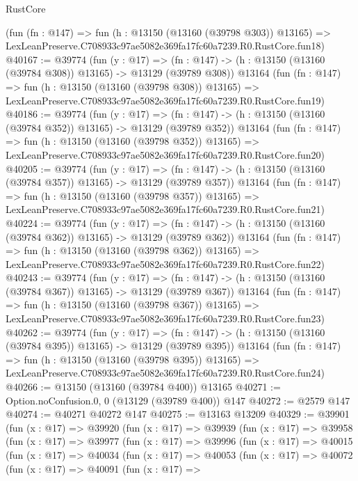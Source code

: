 \begin{lexlean}{RustCore}
\begin{coremodule}
    (fun (fn : @147) =>
    fun (h : @13150 (@13160 (@39798 @303)) @13165) =>
    LexLeanPreserve.C708933c97ae5082e369fa17fc60a7239.R0.RustCore.fun18)
@40167 := @39774
    (fun (y : @17) =>
    (fn : @147) -> (h : @13150 (@13160 (@39784 @308)) @13165) -> @13129 (@39789 @308))
    @13164
    (fun (fn : @147) =>
    fun (h : @13150 (@13160 (@39798 @308)) @13165) =>
    LexLeanPreserve.C708933c97ae5082e369fa17fc60a7239.R0.RustCore.fun19)
@40186 := @39774
    (fun (y : @17) =>
    (fn : @147) -> (h : @13150 (@13160 (@39784 @352)) @13165) -> @13129 (@39789 @352))
    @13164
    (fun (fn : @147) =>
    fun (h : @13150 (@13160 (@39798 @352)) @13165) =>
    LexLeanPreserve.C708933c97ae5082e369fa17fc60a7239.R0.RustCore.fun20)
@40205 := @39774
    (fun (y : @17) =>
    (fn : @147) -> (h : @13150 (@13160 (@39784 @357)) @13165) -> @13129 (@39789 @357))
    @13164
    (fun (fn : @147) =>
    fun (h : @13150 (@13160 (@39798 @357)) @13165) =>
    LexLeanPreserve.C708933c97ae5082e369fa17fc60a7239.R0.RustCore.fun21)
@40224 := @39774
    (fun (y : @17) =>
    (fn : @147) -> (h : @13150 (@13160 (@39784 @362)) @13165) -> @13129 (@39789 @362))
    @13164
    (fun (fn : @147) =>
    fun (h : @13150 (@13160 (@39798 @362)) @13165) =>
    LexLeanPreserve.C708933c97ae5082e369fa17fc60a7239.R0.RustCore.fun22)
@40243 := @39774
    (fun (y : @17) =>
    (fn : @147) -> (h : @13150 (@13160 (@39784 @367)) @13165) -> @13129 (@39789 @367))
    @13164
    (fun (fn : @147) =>
    fun (h : @13150 (@13160 (@39798 @367)) @13165) =>
    LexLeanPreserve.C708933c97ae5082e369fa17fc60a7239.R0.RustCore.fun23)
@40262 := @39774
    (fun (y : @17) =>
    (fn : @147) -> (h : @13150 (@13160 (@39784 @395)) @13165) -> @13129 (@39789 @395))
    @13164
    (fun (fn : @147) =>
    fun (h : @13150 (@13160 (@39798 @395)) @13165) =>
    LexLeanPreserve.C708933c97ae5082e369fa17fc60a7239.R0.RustCore.fun24)
@40266 := @13150 (@13160 (@39784 @400)) @13165
@40271 := Option.noConfusion.{0, 0} (@13129 (@39789 @400)) @147
@40272 := @2579 @147
@40274 := @40271 @40272 @147
@40275 := @13163 @13209
@40329 := @39901
    (fun (x : @17) =>
    @39920
      (fun (x : @17) =>
      @39939
        (fun (x : @17) =>
        @39958
          (fun (x : @17) =>
          @39977
            (fun (x : @17) =>
            @39996
              (fun (x : @17) =>
              @40015
                (fun (x : @17) =>
                @40034
                  (fun (x : @17) =>
                  @40053
                    (fun (x : @17) =>
                    @40072
                      (fun (x : @17) =>
                      @40091
                        (fun (x : @17) =>

\end{coremodule}
\end{lexlean}
